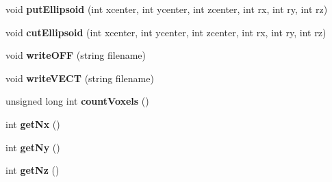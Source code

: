 \begin{DoxyCompactItemize}
void {\bfseries put\+Ellipsoid} (int xcenter, int ycenter, int zcenter, int rx, int ry, int rz)
\item 
\mbox{\label{classsculptor3d_ab65ed666a86d01f428d6f735ad860cc6}} 
void {\bfseries cut\+Ellipsoid} (int xcenter, int ycenter, int zcenter, int rx, int ry, int rz)
\item 
\mbox{\label{classsculptor3d_a7d9b24f6775441135936b184bb4079e0}} 
void {\bfseries write\+O\+FF} (string filename)
\item 
\mbox{\label{classsculptor3d_a60f471805c52556e564477beccc72f6b}} 
void {\bfseries write\+V\+E\+CT} (string filename)
\item 
\mbox{\label{classsculptor3d_a39cb80b54a93e7e2cf8b2beddd7f1b74}} 
unsigned long int {\bfseries count\+Voxels} ()
\item 
\mbox{\label{classsculptor3d_a6f5974b59748b404ac44fef855dbf9ee}} 
int {\bfseries get\+Nx} ()
\item 
\mbox{\label{classsculptor3d_aa354fdd753a7567f782971893f63e05a}} 
int {\bfseries get\+Ny} ()
\item 
\mbox{\label{classsculptor3d_ab393938c4dfdf621eb966d73b82bf705}} 
int {\bfseries get\+Nz} ()
\end{DoxyCompactItemize}
